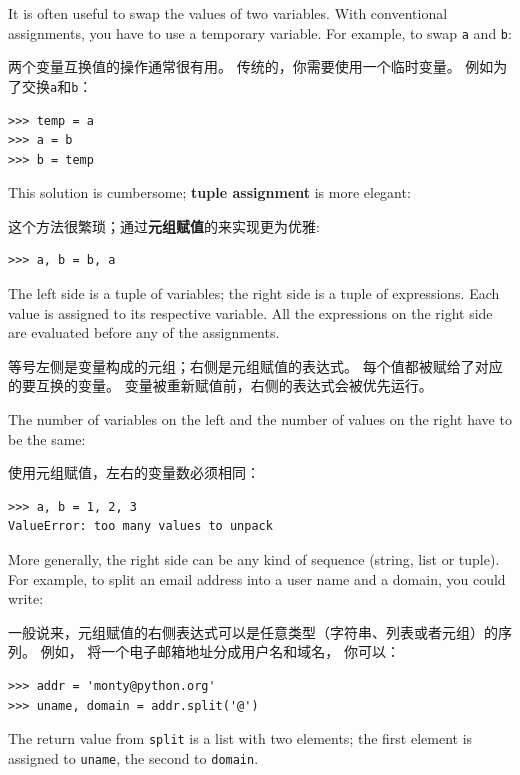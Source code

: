 It is often useful to swap the values of two variables.
With conventional assignments, you have to use a temporary
variable.  For example, to swap {\tt a} and {\tt b}:

两个变量互换值的操作通常很有用。 传统的，你需要使用一个临时变量。 例如为了交换\lstinline{a}和\lstinline{b}：

\begin{lstlisting}
>>> temp = a
>>> a = b
>>> b = temp
\end{lstlisting}
%
This solution is cumbersome; {\bf tuple assignment} is more elegant:

这个方法很繁琐；通过{\bf 元组赋值}的来实现更为优雅:

\begin{lstlisting}
>>> a, b = b, a
\end{lstlisting}
%
The left side is a tuple of variables; the right side is a tuple of
expressions.  Each value is assigned to its respective variable.
All the expressions on the right side are evaluated before any
of the assignments.

等号左侧是变量构成的元组；右侧是元组赋值的表达式。  每个值都被赋给了对应的要互换的变量。  变量被重新赋值前，右侧的表达式会被优先运行。

The number of variables on the left and the number of
values on the right have to be the same:

使用元组赋值，左右的变量数必须相同：


\begin{lstlisting}
>>> a, b = 1, 2, 3
ValueError: too many values to unpack
\end{lstlisting}
%
More generally, the right side can be any kind of sequence
(string, list or tuple).  For example, to split an email address
into a user name and a domain, you could write:

一般说来，元组赋值的右侧表达式可以是任意类型（字符串、列表或者元组）的序列。 例如， 将一个电子邮箱地址分成用户名和域名， 你可以：


\begin{lstlisting}
>>> addr = 'monty@python.org'
>>> uname, domain = addr.split('@')
\end{lstlisting}
%
The return value from {\tt split} is a list with two elements;
the first element is assigned to {\tt uname}, the second to
{\tt domain}.

